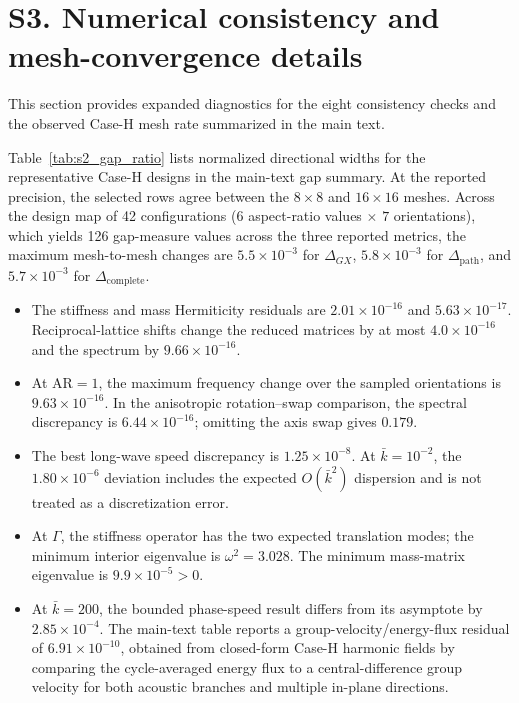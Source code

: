 \documentclass[pdflatex,sn-basic,Numbered]{sn-jnl}
\begin{document}
\section*{S3. Numerical consistency and mesh-convergence details}
This section provides expanded diagnostics for the eight consistency checks and the observed Case-H mesh rate summarized in the main text.

Table~\ref{tab:s2_gap_ratio} lists normalized directional widths for the representative Case-H designs in the main-text gap summary. At the reported precision, the selected rows agree between the $8\times8$ and $16\times16$ meshes. Across the design map of 42 configurations ($6$ aspect-ratio values $\times$ $7$ orientations), which yields 126 gap-measure values across the three reported metrics, the maximum mesh-to-mesh changes are $5.5\times10^{-3}$ for $\Delta_{GX}$, $5.8\times10^{-3}$ for $\Delta_{\mathrm{path}}$, and $5.7\times10^{-3}$ for $\Delta_{\mathrm{complete}}$.
\begin{table}[htbp]
\caption{Normalized directional-gap widths for the representative Case-H designs}
\label{tab:s2_gap_ratio}

\end{table}

\begin{itemize}
  \item The stiffness and mass Hermiticity residuals are $2.01\times10^{-16}$ and $5.63\times10^{-17}$. Reciprocal-lattice shifts change the reduced matrices by at most $4.0\times10^{-16}$ and the spectrum by $9.66\times10^{-16}$.
  \item At $\mathrm{AR}=1$, the maximum frequency change over the sampled orientations is $9.63\times10^{-16}$. In the anisotropic rotation--swap comparison, the spectral discrepancy is $6.44\times10^{-16}$; omitting the axis swap gives $0.179$.
  \item The best long-wave speed discrepancy is $1.25\times10^{-8}$. At $\bar{k}=10^{-2}$, the $1.80\times10^{-6}$ deviation includes the expected $O(\bar{k}^2)$ dispersion and is not treated as a discretization error.
  \item At $\Gamma$, the stiffness operator has the two expected translation modes; the minimum interior eigenvalue is $\omega^2=3.028$. The minimum mass-matrix eigenvalue is $9.9\times10^{-5}>0$.
  \item At $\bar{k}=200$, the bounded phase-speed result differs from its asymptote by $2.85\times10^{-4}$. The main-text table reports a group-velocity/energy-flux residual of $6.91\times10^{-10}$, obtained from closed-form Case-H harmonic fields by comparing the cycle-averaged energy flux to a central-difference group velocity for both acoustic branches and multiple in-plane directions.
\end{itemize}
\end{document}
